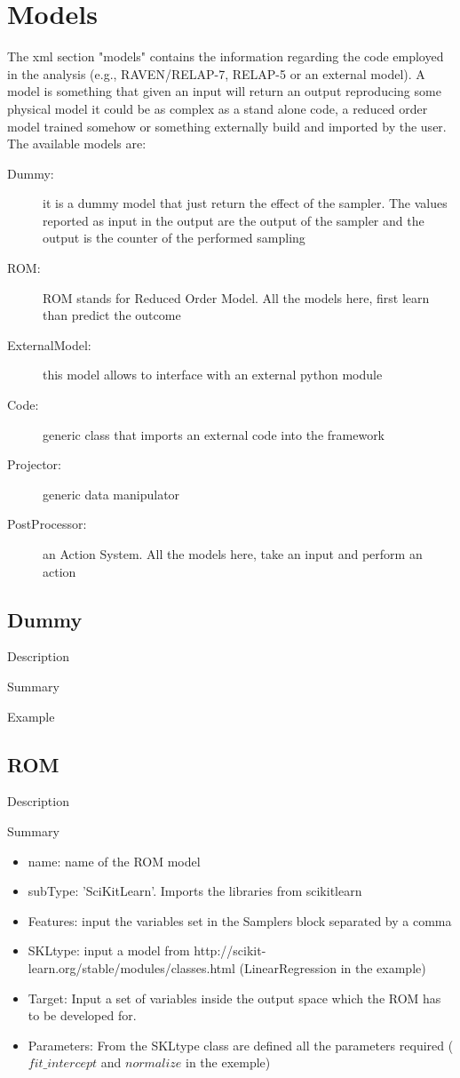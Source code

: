 \section{Models  \\ \vspace{2 mm} {\small }}
\label{sec:models}
The xml section "models" contains the information regarding the code employed in the analysis (e.g., RAVEN/RELAP-7, RELAP-5 or an external model). A model is something that given an input will return an output reproducing some physical model it could be as complex as a stand alone code, a reduced order model trained somehow or something externally build and imported by the user.
The available models are:
\begin{description}
\item [Dummy:] it is a dummy model that just return the effect of the sampler. The values reported as input in the output are the output of the sampler and the output is the counter of the performed sampling
\item [ROM:] ROM stands for Reduced Order Model. All the models here, first learn than predict the outcome
\item [ExternalModel:] this model allows to interface with an external python module
\item [Code:] generic class that imports an external code into the framework
\item [Projector:] generic data manipulator
\item [PostProcessor:] an Action System. All the models here, take an input and perform an action
\end{description}

\subsection{Dummy}
\label{sec:models_dummy}

Description

Summary

Example

\subsection{ROM}
\label{subsec:models_ROM}

Description

Summary 
\begin{itemize}
\item name: name of the ROM model
\item subType: 'SciKitLearn'. Imports the libraries from scikitlearn
\item Features: input the variables set in the Samplers block separated by a comma
\item SKLtype: input a model from http://scikit-learn.org/stable/modules/classes.html (LinearRegression in the example)
\item Target: Input a set of variables inside the output space which the ROM has to be developed for. 
\item Parameters: From the SKLtype class are defined all the parameters required ($fit\_intercept$ and $normalize$ in the exemple) 
\end{itemize}

